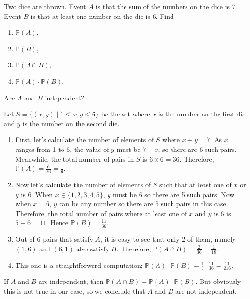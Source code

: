 \begin{question}
    Two dice are thrown. Event $A$ is that the sum of the numbers on the dice
    is 7. Event $B$ is that at least one number on the die is 6. Find 
    \begin{enumerate}
        \item $\mathbb{P}(A)$, 
        
        \item $\mathbb{P}(B)$,
        
        \item $\mathbb{P}(A \cap B)$, 
        
        \item $\mathbb{P}(A) \cdot \mathbb{P}(B)$.
    \end{enumerate}
    Are $A$ and $B$ independent? 
\end{question}
\begin{solution}
    Let $S = \{ (x, y) \mid 1 \leq x, y \leq 6 \}$ be the set where $x$ is the
    number on the first die and $y$ is the number on the second die. 
    \begin{enumerate}
        \item First, let's calculate the number of elements of $S$ where $x + y
            = 7$. As $x$ ranges from 1 to 6, the value of $y$ must be $7 - x$,
            so there are 6 such pairs. Meanwhile, the total number of pairs in
            $S$ is $6 \times 6 = 36$. Therefore, $\mathbb{P}(A) = \frac{6}{36}
            = \frac{1}{6}$.

        \item Now let's calculate the number of elements of $S$ such that at
            least one of $x$ or $y$ is 6. When $x \in \{1, 2, 3, 4, 5\}$, $y$
            must be 6 so there are 5 such pairs. Now when $x = 6$, $y$ can be
            any number so there are 6 such pairs in this case. Therefore, the
            total number of pairs where at least one of $x$ and $y$ is 6 is $5
            + 6 = 11$. Hence $\mathbb{P}(B) = \frac{11}{36}$. 

        \item Out of 6 pairs that satisfy $A$, it is easy to see that only 2 of
            them, namely $(1, 6)$ and $(6, 1)$ also satisfy $B$. Therefore,
            $\mathbb{P}(A \cap B) = \frac{2}{36} = \frac{1}{18}$.

        \item This one is a straightforward computation; $\mathbb{P}(A) \cdot
            \mathbb{P}(B) = \frac{1}{6} \cdot \frac{11}{36} = \frac{11}{216}$. 
    \end{enumerate}

    If $A$ and $B$ are independent, then $\mathbb{P}(A \cap B) = \mathbb{P}(A)
    \cdot \mathbb{P}(B)$. But obviously this is not true in our case, so we
    conclude that $A$ and $B$ are not independent. 
\end{solution}

